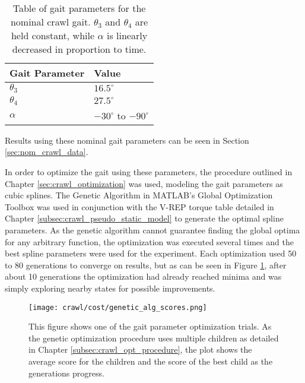 \begin{table}
  \centering
  \begin{tabularx}{0.5\textwidth}{|l||X|}
    \hline
    \textbf{Gait Parameter} & \textbf{Value}                \\  \hline\hline
    $\theta_3$              &   $16.5^\circ$                \\ 
    $\theta_4$              &   $27.5^\circ$                \\  
    $\alpha$                &   $-30^\circ$ to $-90^\circ$  \\  \hline
  \end{tabularx} 
  
  \caption{Table of gait parameters for the nominal crawl gait. $\theta_3$ and $\theta_4$
           are held constant, while $\alpha$ is linearly decreased in proportion to time.}
  \label{tab:nominal_parameters}
\end{table}

Results using these nominal gait parameters can be seen in Section \ref{sec:nom_crawl_data}.


In order to optimize the gait using these parameters, the procedure outlined in Chapter 
\ref{sec:crawl_optimization} was used, modeling the gait parameters as cubic splines.
The Genetic Algorithm in MATLAB's Global Optimization Toolbox was used in conjunction
with the V-REP torque table detailed in Chapter \ref{subsec:crawl_pseudo_static_model}
to generate the optimal spline parameters. 
As the genetic algorithm cannot guarantee finding the global optima for any arbitrary function,
the optimization was executed several times and the best spline parameters were used
for the experiment. Each optimization used 50 to 80 generations to converge on results,
but as can be seen in Figure \ref{fig:ga_generations}, after about 10 generations the
optimization had already reached minima and was simply exploring nearby states for possible
improvements.

\begin{figure}
  \centering
  \texttt{[image: crawl/cost/genetic\_alg\_scores.png]}
  \caption{This figure shows one of the gait parameter optimization trials.
           As the genetic optimization procedure uses multiple children as detailed in Chapter \ref{subsec:crawl_opt_procedure}, the 
           plot shows the average score for the children and the score of the best
           child as the generations progress.}
  \label{fig:ga_generations}
\end{figure}

